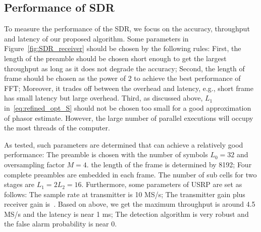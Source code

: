 \subsection{Performance of SDR}

To measure the performance of the SDR, we focus on the accuracy, throughput and latency of our proposed algorithm.
Some parameters in Figure~\ref{fig:SDR_receiver} should be chosen by the following rules:
First, the length of the preamble should be chosen short enough to get the largest throughput as long as it does not degrade the accuracy;
Second, the length of frame should be chosen as the power of 2 to achieve the best performance of FFT; Moreover, 
it trades off between the overhead and latency, e.g., short frame has small latency but large overhead. 
Third, as discussed above, $L_1$ in~\eqref{eq:refined_opt_S} should not be chosen too small for a good approximation of phasor estimate. However, the large number of 
parallel executions will occupy the most threads of the computer.

As tested, such parameters are determined that can achieve a relatively good performance: 
The preamble is chosen with the number of symbols $L_0=32$ and oversampling factor $M=4$.
the length of the frame is determined by 8192; Four complete preambles are embedded in each frame. 
The number of sub cells for two stages are $L_1=2L_2=16$. Furthermore, some parameters of USRP are set as follows:
The sample rate at transmitter is 10 MS/s; The transmitter gain plus receiver gain is~\dB.
Based on above, we get the maximum throughput is around 4.5 MS/s and the latency is near 1 ms;
The detection algorithm is very robust and the false alarm probability is near 0.


